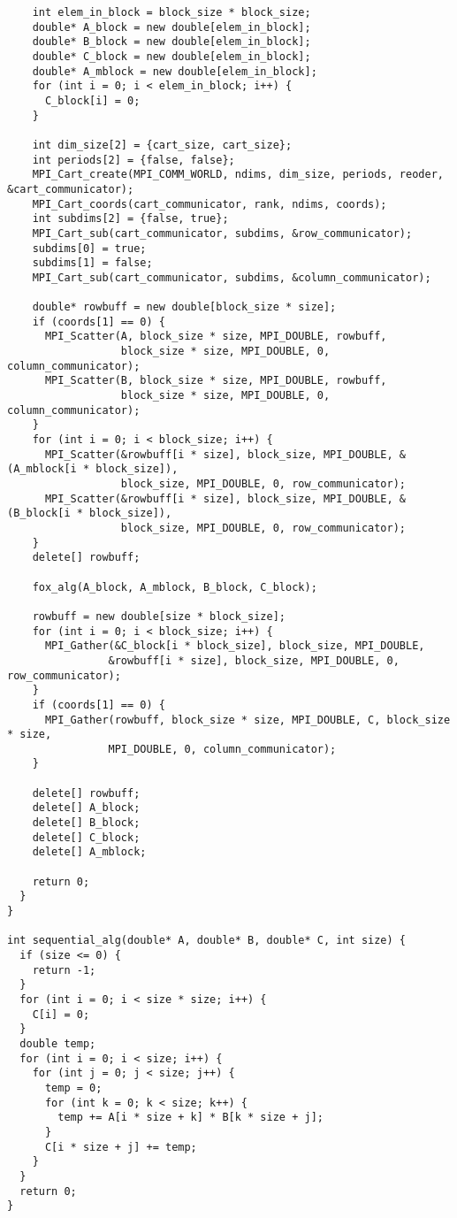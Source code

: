 \documentclass{report}
\begin{document}
\begin{lstlisting}
    int elem_in_block = block_size * block_size;
    double* A_block = new double[elem_in_block];
    double* B_block = new double[elem_in_block];
    double* C_block = new double[elem_in_block];
    double* A_mblock = new double[elem_in_block];
    for (int i = 0; i < elem_in_block; i++) {
      C_block[i] = 0;
    }

    int dim_size[2] = {cart_size, cart_size};
    int periods[2] = {false, false};
    MPI_Cart_create(MPI_COMM_WORLD, ndims, dim_size, periods, reoder, &cart_communicator);
    MPI_Cart_coords(cart_communicator, rank, ndims, coords);
    int subdims[2] = {false, true};
    MPI_Cart_sub(cart_communicator, subdims, &row_communicator);
    subdims[0] = true;
    subdims[1] = false;
    MPI_Cart_sub(cart_communicator, subdims, &column_communicator);

    double* rowbuff = new double[block_size * size];
    if (coords[1] == 0) {
      MPI_Scatter(A, block_size * size, MPI_DOUBLE, rowbuff,
                  block_size * size, MPI_DOUBLE, 0, column_communicator);
      MPI_Scatter(B, block_size * size, MPI_DOUBLE, rowbuff,
                  block_size * size, MPI_DOUBLE, 0, column_communicator);
    }
    for (int i = 0; i < block_size; i++) {
      MPI_Scatter(&rowbuff[i * size], block_size, MPI_DOUBLE, &(A_mblock[i * block_size]),
                  block_size, MPI_DOUBLE, 0, row_communicator);
      MPI_Scatter(&rowbuff[i * size], block_size, MPI_DOUBLE, &(B_block[i * block_size]),
                  block_size, MPI_DOUBLE, 0, row_communicator);
    }
    delete[] rowbuff;

    fox_alg(A_block, A_mblock, B_block, C_block);

    rowbuff = new double[size * block_size];
    for (int i = 0; i < block_size; i++) {
      MPI_Gather(&C_block[i * block_size], block_size, MPI_DOUBLE,
                &rowbuff[i * size], block_size, MPI_DOUBLE, 0, row_communicator);
    }
    if (coords[1] == 0) {
      MPI_Gather(rowbuff, block_size * size, MPI_DOUBLE, C, block_size * size,
                MPI_DOUBLE, 0, column_communicator);
    }

    delete[] rowbuff;
    delete[] A_block;
    delete[] B_block;
    delete[] C_block;
    delete[] A_mblock;

    return 0;
  }
}

int sequential_alg(double* A, double* B, double* C, int size) {
  if (size <= 0) {
    return -1;
  }
  for (int i = 0; i < size * size; i++) {
    C[i] = 0;
  }
  double temp;
  for (int i = 0; i < size; i++) {
    for (int j = 0; j < size; j++) {
      temp = 0;
      for (int k = 0; k < size; k++) {
        temp += A[i * size + k] * B[k * size + j];
      }
      C[i * size + j] += temp;
    }
  }
  return 0;
}

\end{lstlisting}
\end{document}
